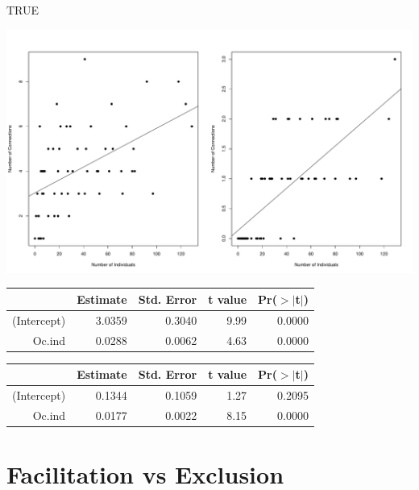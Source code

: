 \documentclass[12pt]{article}
\begin{document}
\begin{Schunk}
\begin{Soutput}
[1] TRUE
\end{Soutput}
\end{Schunk}
\includegraphics{O_cornuta_ms-012}


\begin{table}[ht]
\begin{center}
\begin{tabular}{rrrrr}
  \hline
 & Estimate & Std. Error & t value & Pr($>$$|$t$|$) \\ 
  \hline
(Intercept) & 3.0359 & 0.3040 & 9.99 & 0.0000 \\ 
  Oc.ind & 0.0288 & 0.0062 & 4.63 & 0.0000 \\ 
   \hline
\end{tabular}
\end{center}
\end{table}%
\begin{table}[ht]
\begin{center}
\begin{tabular}{rrrrr}
  \hline
 & Estimate & Std. Error & t value & Pr($>$$|$t$|$) \\ 
  \hline
(Intercept) & 0.1344 & 0.1059 & 1.27 & 0.2095 \\ 
  Oc.ind & 0.0177 & 0.0022 & 8.15 & 0.0000 \\ 
   \hline
\end{tabular}
\end{center}
\end{table}
\section{Facilitation vs Exclusion}
\end{document}
